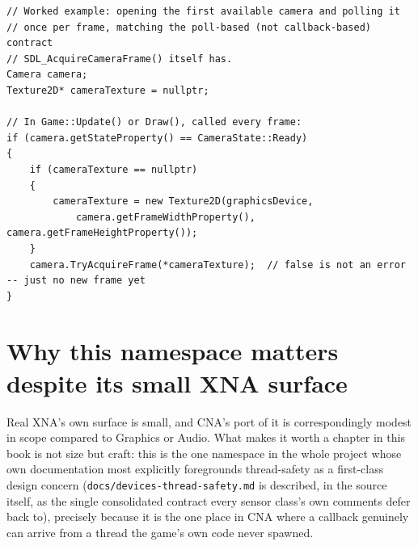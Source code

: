 \begin{lstlisting}
// Worked example: opening the first available camera and polling it
// once per frame, matching the poll-based (not callback-based) contract
// SDL_AcquireCameraFrame() itself has.
Camera camera;
Texture2D* cameraTexture = nullptr;

// In Game::Update() or Draw(), called every frame:
if (camera.getStateProperty() == CameraState::Ready)
{
    if (cameraTexture == nullptr)
    {
        cameraTexture = new Texture2D(graphicsDevice,
            camera.getFrameWidthProperty(), camera.getFrameHeightProperty());
    }
    camera.TryAcquireFrame(*cameraTexture);  // false is not an error -- just no new frame yet
}
\end{lstlisting}

\section{Why this namespace matters despite its small XNA surface}

Real XNA's own  surface is small, and CNA's port of it is
correspondingly modest in scope compared to Graphics or Audio. What makes it worth a chapter
in this book is not size but craft: this is the one namespace in the whole project whose own
documentation most explicitly foregrounds thread-safety as a first-class design concern
(\texttt{docs/devices-thread-safety.md} is described, in the source itself, as the single
consolidated contract every sensor class's own comments defer back to), precisely because it
is the one place in CNA where a callback genuinely can arrive from a thread the game's own
code never spawned.
